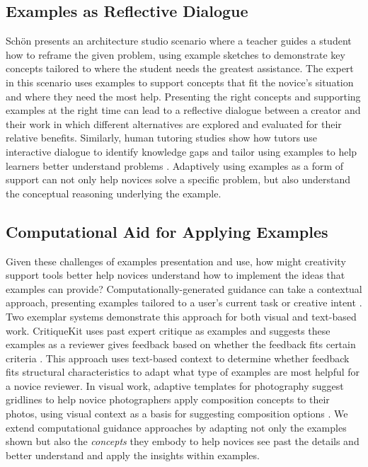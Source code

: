 

\subsection{Examples as Reflective Dialogue}
Sch{\"o}n \cite{schon1984reflective} presents an architecture studio scenario where a teacher guides a student how to reframe the given problem, using example sketches to demonstrate key concepts tailored to where the student needs the greatest assistance. The expert in this scenario uses examples to support concepts that fit the novice's situation and where they need the most help. Presenting the right concepts and supporting examples at the right time can lead to a reflective dialogue between a creator and their work in which different alternatives are explored and evaluated for their relative benefits. Similarly, human tutoring studies show how tutors use interactive dialogue to identify knowledge gaps and tailor using examples to help learners better understand problems \cite{Chi2001,mclaren2008}. Adaptively using examples as a form of support can not only help novices solve a specific problem, but also understand the conceptual reasoning underlying the example.

\subsection{Computational Aid for Applying Examples}
Given these challenges of examples presentation and use, how might creativity support tools better help novices understand how to implement the ideas that examples can provide?
Computationally-generated guidance can take a contextual approach, presenting examples tailored to a user's current task or creative intent \cite{fraser2019replay,kandel2011wrangler,kumar2011, Lee2010}. Two exemplar systems demonstrate this approach for both visual and text-based work. CritiqueKit uses past expert critique as examples and suggests these examples as a reviewer gives feedback based on whether the feedback fits certain criteria \cite{ngoon2018interactive}. This approach uses text-based context to determine whether feedback fits structural characteristics to adapt what type of examples are most helpful for a novice reviewer. In visual work, adaptive templates for photography suggest gridlines to help novice photographers apply composition concepts to their photos, using visual context as a basis for suggesting composition options \cite{jane2020adaptive}. We extend computational guidance approaches by adapting not only the examples shown but also the \textit{concepts} they embody to help novices see past the details and better understand and apply the insights within examples.